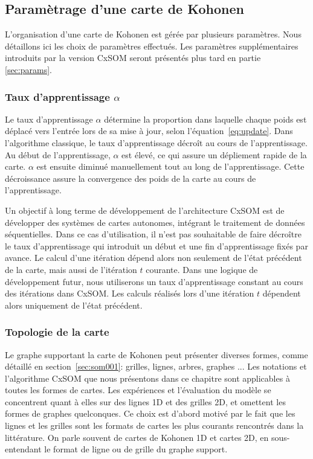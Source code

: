 \subsection{Paramètrage d'une carte de Kohonen}
L'organisation d'une carte de Kohonen est gérée par plusieurs paramètres. 
Nous détaillons ici les choix de paramètres effectués. Les paramètres supplémentaires introduits par la version CxSOM seront présentés plus tard en partie \ref{sec:params}.

\subsubsection{Taux d'apprentissage $\alpha$}
Le taux d'apprentissage $\alpha$ détermine la proportion dans laquelle chaque poids est déplacé vers l'entrée lors de sa mise à jour, selon l'équation~\ref{eq:update}. Dans l'algorithme classique, le taux d'apprentissage décroît au cours de l'apprentissage. Au début de l'apprentissage, $\alpha$ est élevé, ce qui assure un dépliement rapide de la carte. $\alpha$ est ensuite diminué manuellement tout au long de l'apprentissage. Cette décroissance assure la convergence des poids de la carte au cours de l'apprentissage.

Un objectif à long terme de développement de l'architecture CxSOM est de développer des systèmes de cartes autonomes, intégrant le traitement de données séquentielles. Dans ce cas d'utilisation, il n'est pas souhaitable de faire décroître le taux d'apprentissage qui introduit un début et une fin d'apprentissage fixés par avance. Le calcul d'une itération dépend alors non seulement de l'état précédent de la carte, mais aussi de l'itération $t$ courante.
Dans une logique de développement futur, nous utiliserons un taux d'apprentissage constant au cours des itérations dans CxSOM. Les calculs réalisés lors d'une itération $t$ dépendent alors uniquement de l'état précédent.


\subsubsection{Topologie de la carte}

Le graphe supportant la carte de Kohonen peut présenter diverses formes, comme détaillé en section~\ref{sec:som001}: grilles, lignes, arbres, graphes ... Les notations et l'algorithme CxSOM que nous présentons dans ce chapitre sont applicables à toutes les formes de cartes. Les expériences et l'évaluation du modèle se concentrent quant à elles sur des lignes 1D et des grilles 2D, et omettent les formes de graphes quelconques. Ce choix est d'abord motivé par le fait que les lignes et les grilles sont les formats de cartes les plus courants rencontrés dans la littérature. On parle souvent de cartes de Kohonen 1D et cartes 2D, en sous-entendant le format de ligne ou de grille du graphe support. 


